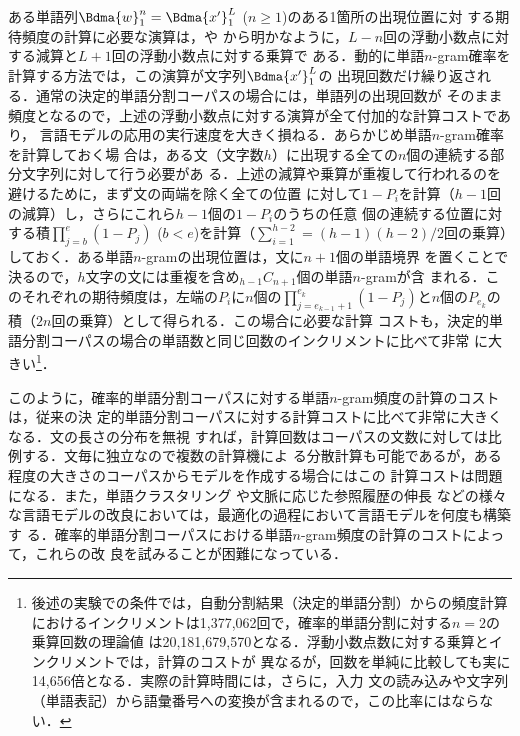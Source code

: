 \documentclass[japanese]{jnlp_1.4}
\begin{document}
ある単語列$\Bdma{w}_{1}^{n} = \Bdma{x'}_{1}^{L}$ ($n\geq1$)のある1箇所の出現位置に対
する期待頻度の計算に必要な演算は，や
から明かなように，$L-n$回の浮動小数点に対する減算と$L+1$回の浮動小数点に対する乗算で
ある．動的に単語$n$-gram確率を計算する方法では，この演算が文字列$\Bdma{x'}_{1}^{L}$の
出現回数だけ繰り返される．通常の決定的単語分割コーパスの場合には，単語列の出現回数が
そのまま頻度となるので，上述の浮動小数点に対する演算が全て付加的な計算コストであり，
言語モデルの応用の実行速度を大きく損ねる．あらかじめ単語$n$-gram確率を計算しておく場
合は，ある文（文字数$h$）に出現する全ての$n$個の連続する部分文字列に対して行う必要があ
る．上述の減算や乗算が重複して行われるのを避けるために，まず文の両端を除く全ての位置
に対して$1-P_{i}$を計算（$h-1$回の減算）し，さらにこれら$h-1$個の$1-P_{i}$のうちの任意
個の連続する位置に対する積$\prod_{j=b}^{e}(1-P_{j})$ ($b<e$)を計算（$\sum_{i=1}^{h-2}
=(h-1)(h-2)/2$回の乗算）しておく．ある単語$n$-gramの出現位置は，文に$n+1$個の単語境界
を置くことで決るので，$h$文字の文には重複を含め${}_{h-1}C_{n+1}$個の単語$n$-gramが含
まれる．このそれぞれの期待頻度は，左端の$P_{i}$に$n$個の$\prod_{j=e_{k-1}+1}^{e_{k}}
(1-P_{j})$と$n$個の$P_{e_{k}}$の積（$2n$回の乗算）として得られる．この場合に必要な計算
コストも，決定的単語分割コーパスの場合の単語数と同じ回数のインクリメントに比べて非常
に大きい\footnote{後述の実験での条件では，自動分割結果（決定的単語分割）からの頻度計算
におけるインクリメントは1,377,062回で，確率的単語分割に対する$n=2$の乗算回数の理論値
は20,181,679,570となる．浮動小数点数に対する乗算とインクリメントでは，計算のコストが
異なるが，回数を単純に比較しても実に14,656倍となる．実際の計算時間には，さらに，入力
文の読み込みや文字列（単語表記）から語彙番号への変換が含まれるので，この比率にはならな
い．}．

このように，確率的単語分割コーパスに対する単語$n$-gram頻度の計算のコストは，従来の決
定的単語分割コーパスに対する計算コストに比べて非常に大きくなる．文の長さの分布を無視
すれば，計算回数はコーパスの文数に対しては比例する．文毎に独立なので複数の計算機によ
る分散計算も可能であるが，ある程度の大きさのコーパスからモデルを作成する場合にはこの
計算コストは問題になる．また，単語クラスタリング
\cite{Class-Based.n-gram.Models.of.Natural.Language}や文脈に応じた参照履歴の伸長
\cite{The.Power.of.Amnesia:.Learning.Probabilistic.Automata.with.Variable.Memory.Length}
などの様々な言語モデルの改良においては，最適化の過程において言語モデルを何度も構築す
る．確率的単語分割コーパスにおける単語$n$-gram頻度の計算のコストによって，これらの改
良を試みることが困難になっている．
\end{document}
